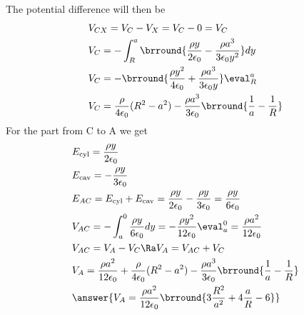 {\begin{enumerate}
The potential difference will then be
\begin{align*}
    &V_{CX}=V_C-V_X=V_C-0=V_C\\
    &V_C=-\int_R^a\brround{\frac{\rho y}{2\epsilon_0}-\frac{\rho a^3}{3\epsilon_0y^2}}dy\\
    &V_C=-\brround{\frac{\rho y^2}{4\epsilon_0}+\frac{\rho a^3}{3\epsilon_0y}}\eval_R^a\\
    &V_C=\frac{\rho}{4\epsilon_0}(R^2-a^2)-\frac{\rho a^3}{3\epsilon_0}\brround{\frac{1}{a}-\frac{1}{R}}
\end{align*}
For the part from C to A we get
\begin{align*}
    &E_\text{cyl}=\frac{\rho y}{2\epsilon_0}\\
    &E_\text{cav}=-\frac{\rho y}{3\epsilon_0}\\
    &E_{AC}=E_\text{cyl}+E_\text{cav}=\frac{\rho y}{2\epsilon_0}-\frac{\rho y}{3\epsilon_0}=\frac{\rho y}{6\epsilon_0}\\
    &V_{AC}=-\int_a^0\frac{\rho y}{6\epsilon_0}dy=-\frac{\rho y^2}{12\epsilon_0}\eval_a^0=\frac{\rho a^2}{12\epsilon_0}\\
    &V_{AC}=V_A-V_C\Ra V_A=V_{AC}+V_C\\
    &V_A=\frac{\rho a^2}{12\epsilon_0}+\frac{\rho}{4\epsilon_0}(R^2-a^2)-\frac{\rho a^3}{3\epsilon_0}\brround{\frac{1}{a}-\frac{1}{R}}\\
    &\answer{V_A=\frac{\rho a^2}{12\epsilon_0}\brround{3\frac{R^2}{a^2}+4\frac{a}{R}-6}}
\end{align*}
\end{enumerate}
}{}
